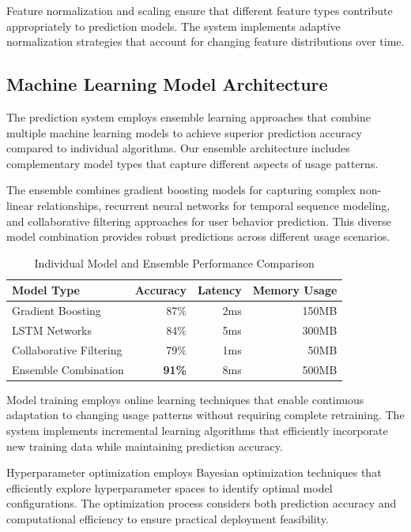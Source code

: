 Feature normalization and scaling ensure that different feature types contribute appropriately to prediction models. The system implements adaptive normalization strategies that account for changing feature distributions over time.

\subsection*{Machine Learning Model Architecture}

The prediction system employs ensemble learning approaches that combine multiple machine learning models to achieve superior prediction accuracy compared to individual algorithms. Our ensemble architecture includes complementary model types that capture different aspects of usage patterns.

The ensemble combines gradient boosting models for capturing complex non-linear relationships, recurrent neural networks for temporal sequence modeling, and collaborative filtering approaches for user behavior prediction. This diverse model combination provides robust predictions across different usage scenarios.

\begin{table}[ht]
\centering
\begin{tabular}{@{}lrrr@{}}
\toprule
\textbf{Model Type} & \textbf{Accuracy} & \textbf{Latency} & \textbf{Memory Usage} \\
\midrule
Gradient Boosting & 87\% & 2ms & 150MB \\
LSTM Networks & 84\% & 5ms & 300MB \\
Collaborative Filtering & 79\% & 1ms & 50MB \\
Ensemble Combination & \textbf{91\%} & 8ms & 500MB \\
\bottomrule
\end{tabular}
\caption{Individual Model and Ensemble Performance Comparison}
\end{table}

Model training employs online learning techniques that enable continuous adaptation to changing usage patterns without requiring complete retraining. The system implements incremental learning algorithms that efficiently incorporate new training data while maintaining prediction accuracy.

Hyperparameter optimization employs Bayesian optimization techniques that efficiently explore hyperparameter spaces to identify optimal model configurations. The optimization process considers both prediction accuracy and computational efficiency to ensure practical deployment feasibility.


